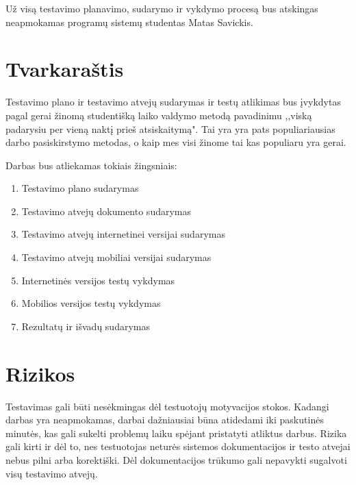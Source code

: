 \documentclass[oneside]{VUMIFPSkursinis}
\begin{document}
Už visą testavimo planavimo, sudarymo ir vykdymo procesą bus atskingas neapmokamas programų sistemų studentas Matas Savickis.  

\section{Tvarkaraštis}
Testavimo plano ir testavimo atvejų sudarymas ir testų atlikimas bus įvykdytas pagal gerai žinomą studentišką laiko valdymo metodą pavadinimu ,,viską padarysiu per vieną naktį prieš atsiskaitymą". Tai yra yra pats populiariausias darbo pasiskirstymo metodas, o kaip mes visi žinome tai kas populiaru yra gerai.\newline



Darbas bus atliekamas tokiais žingsniais:

\begin{enumerate}
	\item{Testavimo plano sudarymas}
	\item{Testavimo atvejų dokumento sudarymas}
	\item{Testavimo atvejų internetinei versijai sudarymas}
	\item{Testavimo atvejų mobiliai versijai sudarymas}
	\item{Internetinės versijos testų vykdymas}
	\item{Mobilios versijos testų vykdymas}
	\item{Rezultatų ir išvadų sudarymas}
\end{enumerate}

\section{Rizikos}
Testavimas gali būti nesėkmingas dėl testuotojų motyvacijos stokos. Kadangi darbas yra neapmokamas, darbai dažniausiai būna atidedami iki paskutinės minutės, kas gali sukelti problemų laiku spėjant pristatyti atliktus darbus. Rizika gali kirti ir dėl to, nes  testuotojas neturės sistemos dokumentacijos ir testo atvejai nebus pilni arba korektiški. Dėl dokumentacijos trūkumo gali nepavykti sugalvoti visų testavimo atvejų.

	
\end{document}
